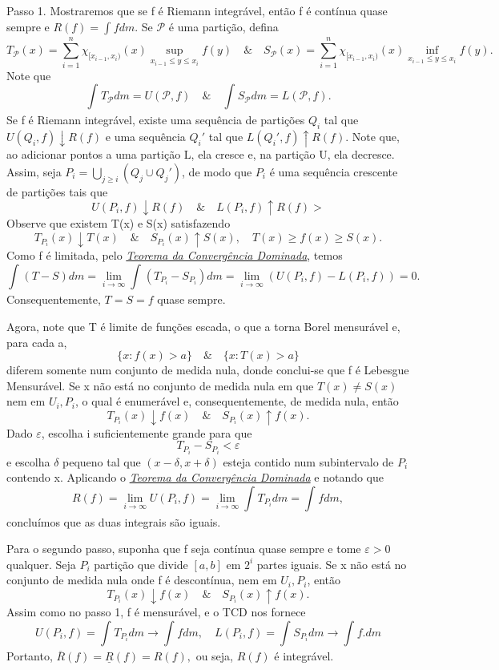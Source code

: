\documentclass[MeasureTheory/measure_theory.tex]{subfiles}
\begin{document}
\begin{proof*}
	Passo 1. Mostraremos que se f é Riemann integrável, então f é contínua quase sempre e \(R(f) = \int_{}f dm.\) Se \(\mathcal{P}\) é uma partição, defina
	\[
		T_{\mathcal{P}}(x) = \sum\limits_{i=1}^{n}\chi_{[x_{i-1}, x_{i})}(x)\sup_{x_{i-1}\leq y\leq x_{i}}f(y) \quad\&\quad S_{\mathcal{P}}(x) = \sum\limits_{i=1}^{n}\chi_{[x_{i-1}, x_{i})}(x)\inf_{x_{i-1}\leq y\leq x_{i}}f(y).
	\]
	Note que
	\[
		\int_{}T_{\mathcal{P}} dm = U(\mathcal{P}, f) \quad\&\quad \int_{}S_{\mathcal{P}} dm = L(\mathcal{P}, f).
	\]
	Se f é Riemann integrável, existe uma sequência de partições \(Q_{i}\) tal que \(U(Q_{i}, f)\downarrow R(f)\) e uma sequência \(Q_{i}'\) tal que \(L(Q_{i}', f)\uparrow R(f).\) Note que, ao adicionar pontos a uma partição L, ela cresce e,
	na partição U, ela decresce. Assim, seja \(P_{i} = \bigcup_{j\geq i}^{}(Q_{j}\cup Q_{j}')\), de modo que \(P_{i}\) é uma sequência crescente de partições tais que
	\[
		U(P_{i}, f)\downarrow R(f)\quad\&\quad L(P_{i}, f)\uparrow R(f)>
	\]
	Observe que existem T(x) e S(x) satisfazendo
	\[
		T_{P_{i}}(x)\downarrow T(x) \quad\&\quad S_{P_{i}}(x)\uparrow S(x),\quad T(x)\geq f(x)\geq S(x).
	\]
	Como f é limitada, pelo \hyperlink{dominated_convergence}{\textit{Teorema da Convergência Dominada}}, temos
	\[
		\int_{}(T-S) dm = \lim_{i\to \infty}\int_{}(T_{P_{i}} - S_{P_{i}}) dm = \lim_{i\to \infty}(U(P_{i}, f) - L(P_{i}, f)) = 0.
	\]
	Consequentemente, \(T = S = f\) quase sempre.

	Agora, note que T é limite de funções escada, o que a torna Borel mensurável e, para cada a,
	\[
		\{x:f(x)>a\}\quad\&\quad \{x:T(x)>a\}
	\]
	diferem somente num conjunto de medida nula, donde conclui-se que f é Lebesgue Mensurável. Se x não está no conjunto de medida nula em que \(T(x)\neq S(x)\) nem em \(U_{i}, P_{i}\),
	o qual é enumerável e, consequentemente, de medida nula, então
	\[
		T_{P_{i}}(x)\downarrow f(x) \quad\&\quad S_{P_{i}}(x)\uparrow f(x).
	\]
	Dado \(\varepsilon \), escolha i suficientemente grande para que
	\[
		T_{P_{i}} - S_{P_{i}} < \varepsilon
	\]
	e escolha \(\delta \) pequeno tal que \((x-\delta , x+\delta )\) esteja contido num subintervalo de \(P_{i}\) contendo x. Aplicando o \hyperlink{dominated_convergence}{\textit{Teorema da Convergência Dominada}} e notando que
	\[
		R(f) = \lim_{i\to \infty}U(P_{i}, f) = \lim_{i\to \infty}\int_{}T_{P_{i}} dm = \int_{}f dm,
	\]
	concluímos que as duas integrais são iguais.

	Para o segundo passo, suponha que f seja contínua quase sempre e tome \(\varepsilon >0\) qualquer. Seja \(P_{i}\) partição que divide \([a, b]\) em \(2^{i}\) partes iguais. Se x não está no conjunto de medida nula onde f é descontínua, nem
	em \(U_{i}, P_{i}\), então
	\[
		T_{P_{i}}(x)\downarrow f(x)\quad\&\quad S_{P_{i}}(x)\uparrow f(x).
	\]
	Assim como no passo 1, f é mensurável, e o TCD nos fornece
	\[
		U(P_{i}, f) = \int_{}T_{P_{i}} dm\to \int_{}f dm,\quad L(P_{i}, f) = \int_{}S_{P_{i}} dm\to \int_{}f. dm
	\]
	Portanto, \(\overline{R}(f) = \underline{R}(f) = R(f),\) ou seja, \(R(f)\) é integrável. \qedsymbol
\end{proof*}
\end{document}
